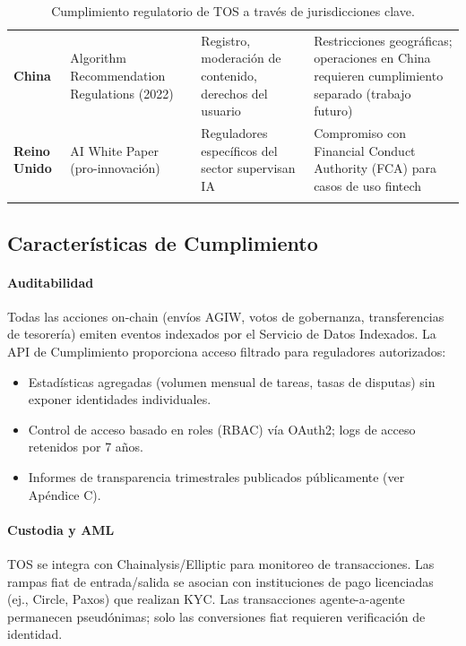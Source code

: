 \documentclass[11pt]{article}
\begin{document}
\begin{longtable}{@{}p{}p{}p{}p{}@{}}
\textbf{China} & Algorithm Recommendation Regulations (2022) & Registro, moderación de contenido, derechos del usuario & Restricciones geográficas; operaciones en China requieren cumplimiento separado (trabajo futuro) \\
\textbf{Reino Unido} & AI White Paper (pro-innovación) & Reguladores específicos del sector supervisan IA & Compromiso con Financial Conduct Authority (FCA) para casos de uso fintech \\
\bottomrule
\caption{Cumplimiento regulatorio de TOS a través de jurisdicciones clave.}
\end{longtable}

\subsection{Características de Cumplimiento}

\paragraph{Auditabilidad}
Todas las acciones on-chain (envíos AGIW, votos de gobernanza, transferencias de tesorería) emiten eventos indexados por el Servicio de Datos Indexados. La API de Cumplimiento proporciona acceso filtrado para reguladores autorizados:
\begin{itemize}[noitemsep]
  \item Estadísticas agregadas (volumen mensual de tareas, tasas de disputas) sin exponer identidades individuales.
  \item Control de acceso basado en roles (RBAC) vía OAuth2; logs de acceso retenidos por 7 años.
  \item Informes de transparencia trimestrales publicados públicamente (ver Apéndice C).
\end{itemize}

\paragraph{Custodia y AML}
TOS se integra con Chainalysis/Elliptic para monitoreo de transacciones. Las rampas fiat de entrada/salida se asocian con instituciones de pago licenciadas (ej., Circle, Paxos) que realizan KYC. Las transacciones agente-a-agente permanecen pseudónimas; solo las conversiones fiat requieren verificación de identidad.
\end{document}
